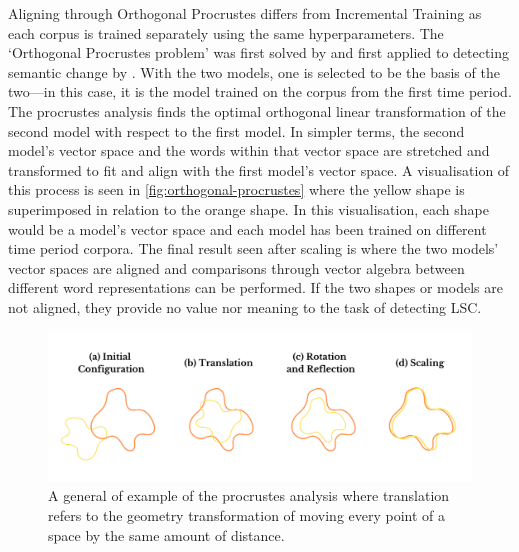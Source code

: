 Aligning through Orthogonal Procrustes differs from Incremental Training as each corpus is trained separately using the same hyperparameters. The `Orthogonal Procrustes problem' was first solved by \citet{schonemann1966} and first applied to detecting semantic change by \citet{hamilton-etal-2016-diachronic}. With the two models, one is selected to be the basis of the two—in this case, it is the model trained on the corpus from the first time period. The procrustes analysis finds the optimal orthogonal linear transformation of the second model with respect to the first model. In simpler terms, the second model’s vector space and the words within that vector space are stretched and transformed to fit and align with the first model’s vector space. A visualisation of this process is seen in \autoref{fig:orthogonal-procrustes} where the yellow shape is superimposed in relation to the orange shape. In this visualisation, each shape would be a model's vector space and each model has been trained on different time period corpora. The final result seen after scaling is where the two models' vector spaces are aligned and comparisons through vector algebra between different word representations can be performed. If the two shapes or models are not aligned, they provide no value nor meaning to the task of detecting LSC. 

\begin{figure}[h]
  \centering
  \includegraphics[width=1\linewidth]{sections/figures/orthogonal-procrustes.png}
  \caption{A general of example of the procrustes analysis where translation refers to the geometry transformation of moving every point of a space by the same amount of distance.}
  \label{fig:orthogonal-procrustes}
\end{figure}


